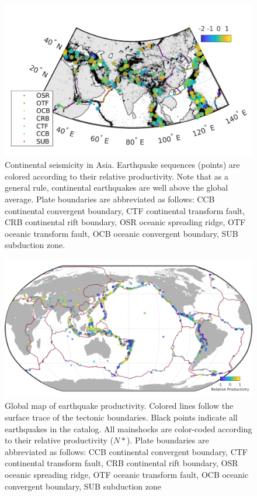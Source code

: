 \documentclass[12pt, notitlepage]{report}
\begin{document}
\begin{figure}
    \centering
    \includegraphics{figures/continental.png}
    \caption{Continental seismicity in Asia. Earthquake sequences (points) are colored according to their relative productivity. Note that as a general rule, continental earthquakes are well above the global average. Plate boundaries are abbreviated as follows: CCB continental convergent boundary, CTF continental transform fault, CRB continental rift boundary, OSR oceanic spreading ridge, OTF oceanic transform fault, OCB oceanic convergent boundary, SUB subduction zone.}
    \label{fig:continental}
\end{figure}

\begin{figure}
\includegraphics{figures/worldmap_res.png}
    \caption{Global map of earthquake productivity. Colored lines follow the surface trace of the tectonic boundaries. Black points indicate all earthquakes in the catalog. All mainshocks are color-coded according to their relative productivity ($N*$). Plate boundaries are abbreviated as follows: CCB continental convergent boundary, CTF continental transform fault, CRB continental rift boundary, OSR oceanic spreading ridge, OTF oceanic transform fault, OCB oceanic convergent boundary, SUB subduction zone} 
    \label{fig:global_res}
\end{figure}
\end{document}
